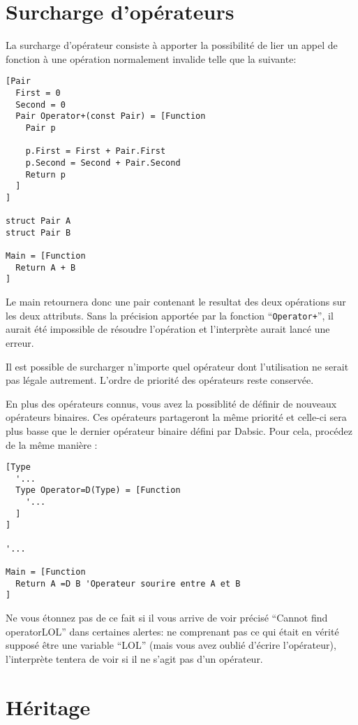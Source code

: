 \documentclass[a5paper, 12pt]{book}
\begin{document}
\section{Surcharge d'opérateurs}

La surcharge d'opérateur consiste à apporter la possibilité
de lier un appel de fonction à une opération normalement
invalide telle que la suivante:\\

\begin{verbatim}
[Pair
  First = 0
  Second = 0
  Pair Operator+(const Pair) = [Function
    Pair p
    
    p.First = First + Pair.First
    p.Second = Second + Pair.Second
    Return p
  ]
]

struct Pair A
struct Pair B

Main = [Function
  Return A + B
]
\end{verbatim}

Le main retournera donc une pair contenant le resultat
des deux opérations sur les deux attributs. Sans la
précision apportée par la fonction ``\verb!Operator+!'', il
aurait été impossible de résoudre l'opération et l'interprète
aurait lancé une erreur.

Il est possible de surcharger n'importe quel opérateur
dont l'utilisation ne serait pas légale autrement.
L'ordre de priorité des opérateurs reste conservée.

En plus des opérateurs connus, vous avez la possiblité
de définir de nouveaux opérateurs binaires. Ces opérateurs
partageront la même priorité et celle-ci sera plus
basse que le dernier opérateur binaire défini par Dabsic.
Pour cela, procédez de la même manière :\\

\begin{verbatim}
[Type
  '...
  Type Operator=D(Type) = [Function
    '...
  ]
]

'...

Main = [Function
  Return A =D B 'Operateur sourire entre A et B
]
\end{verbatim}

Ne vous étonnez pas de ce fait si il vous arrive
de voir précisé ``Cannot find operatorLOL'' dans
certaines alertes: ne comprenant pas ce qui était
en vérité supposé être une variable ``LOL'' (mais
vous avez oublié d'écrire l'opérateur), l'interprète
tentera de voir si il ne s'agit pas d'un opérateur.

\section{Héritage}
\end{document}
